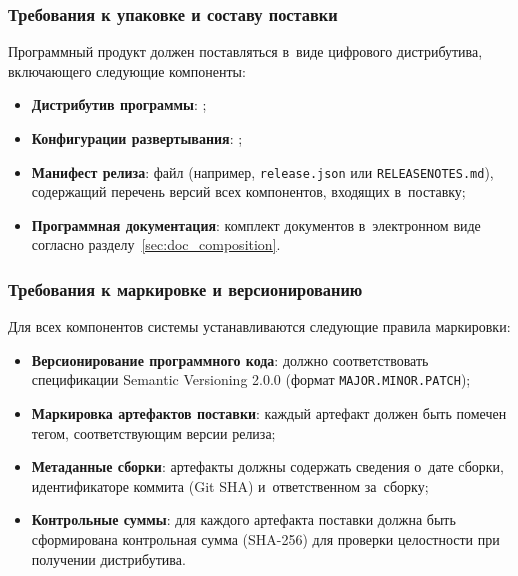 \documentclass[12pt,a4paper]{extarticle}
\begin{document}
\subsubsection{Требования к упаковке и составу поставки}

\begin{hseExample}
Программный продукт должен поставляться в~виде цифрового дистрибутива, включающего следующие компоненты:
\begin{itemize}[nosep, leftmargin=1.25cm]
    \item \textbf{Дистрибутив программы}: ;
    \item \textbf{Конфигурации развертывания}: ;
    \item \textbf{Манифест релиза}: файл (например, \texttt{release.json} или \texttt{RELEASENOTES.md}), содержащий перечень версий всех компонентов, входящих в~поставку;
    \item \textbf{Программная документация}: комплект документов в~электронном виде согласно разделу~\ref{sec:doc_composition}.
\end{itemize}
\end{hseExample}

\subsubsection{Требования к маркировке и версионированию}

\begin{hseExample}
Для всех компонентов системы устанавливаются следующие правила маркировки:
\begin{itemize}[nosep, leftmargin=1.25cm]
    \item \textbf{Версионирование программного кода}: должно соответствовать спецификации Semantic Versioning 2.0.0 (формат \texttt{MAJOR.MINOR.PATCH});
    \item \textbf{Маркировка артефактов поставки}: каждый артефакт должен быть помечен тегом, соответствующим версии релиза;
    \item \textbf{Метаданные сборки}: артефакты должны содержать сведения о~дате сборки, идентификаторе коммита (Git SHA) и~ответственном за~сборку;
    \item \textbf{Контрольные суммы}: для каждого артефакта поставки должна быть сформирована контрольная сумма (SHA-256) для проверки целостности при получении дистрибутива.
\end{itemize}
\end{hseExample}
\end{document}
